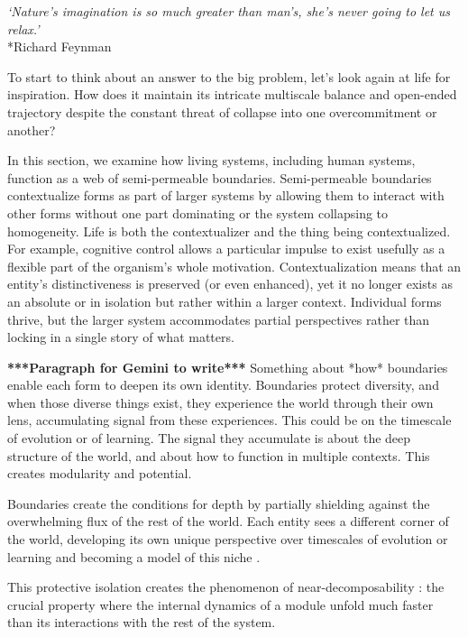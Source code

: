 \documentclass[12pt]{article}
\begin{document}
\begin{center}
\textit{`Nature's imagination is so much greater than man's, she's never going to let us relax.'}\\*Richard Feynman
\end{center}

To start to think about an answer to the big problem, let's look again at life for inspiration. How does it maintain its intricate multiscale balance and open-ended trajectory \citep{stanley2017open} despite the constant threat of collapse into one overcommitment or another? 

In this section, we examine how living systems, including human systems, function as a web of semi-permeable boundaries. Semi-permeable boundaries contextualize forms as part of larger systems by allowing them to interact with other forms without one part dominating or the system collapsing to homogeneity. Life is both the contextualizer and the thing being contextualized. For example, cognitive control allows a particular impulse to exist usefully as a flexible part of the organism's whole motivation. Contextualization means that an entity's distinctiveness is preserved (or even enhanced), yet it no longer exists as an absolute or in isolation but rather within a larger context. Individual forms thrive, but the larger system accommodates partial perspectives rather than locking in a single story of what matters. 

\textbf{***Paragraph for Gemini to write***} Something about *how* boundaries enable each form to deepen its own identity. Boundaries protect diversity, and when those diverse things exist, they experience the world through their own lens, accumulating signal from these experiences. This could be on the timescale of evolution or of learning. The signal they accumulate is about the deep structure of the world, and about how to function in multiple contexts. This creates modularity and potential. 

Boundaries create the conditions for depth by partially shielding against the overwhelming flux of the rest of the world. Each entity sees a different corner of the world, developing its own unique perspective over timescales of evolution or learning and becoming a model of this niche \citep{conant1970every, friston2013life}. 

This protective isolation creates the phenomenon of near-decomposability \citep{simon2018near}: the crucial property where the internal dynamics of a module unfold much faster than its interactions with the rest of the system.  \citep{clune2013evolutionary}
\end{document}
